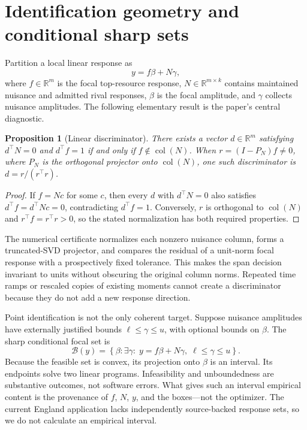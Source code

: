 \documentclass[11pt]{article}
\newtheorem{proposition}{Proposition}
\newcommand{\col}{\operatorname{col}}
\newcommand{\R}{\mathbb{R}}
\begin{document}
\section{Identification geometry and conditional sharp sets}
\label{sec:geometry}

Partition a local linear response as
\begin{equation}
  y=f\beta+N\gamma,
  \label{eq:linearresponse}
\end{equation}
where $f\in\R^m$ is the focal top-resource response, $N\in\R^{m\times k}$ contains
maintained nuisance and admitted rival responses, $\beta$ is the focal amplitude,
and $\gamma$ collects nuisance amplitudes. The following elementary result is the
paper's central diagnostic.

\begin{proposition}[Linear discriminator]
\label{prop:discriminator}
There exists a vector $d\in\R^m$ satisfying $d^{\top}N=0$ and
$d^{\top}f=1$ if and only if $f\notin\col(N)$. When $r=(I-P_N)f\neq0$, where
$P_N$ is the orthogonal projector onto $\col(N)$, one such discriminator is
$d=r/(r^{\top}r)$.
\end{proposition}

\begin{proof}
If $f=Nc$ for some $c$, then every $d$ with $d^{\top}N=0$ also satisfies
$d^{\top}f=d^{\top}Nc=0$, contradicting $d^{\top}f=1$. Conversely, $r$ is
orthogonal to $\col(N)$ and $r^{\top}f=r^{\top}r>0$, so the stated normalization
has both required properties.
\end{proof}

The numerical certificate normalizes each nonzero nuisance column, forms a
truncated-SVD projector, and compares the residual of a unit-norm focal response
with a prospectively fixed tolerance. This makes the span decision invariant to
units without obscuring the original column norms. Repeated time ramps or rescaled
copies of existing moments cannot create a discriminator because they do not add
a new response direction.

Point identification is not the only coherent target. Suppose nuisance
amplitudes have externally justified bounds $\ell\leq\gamma\leq u$, with optional
bounds on $\beta$. The sharp conditional focal set is
\begin{equation}
  \mathcal B(y)=\left\{\beta:\exists\gamma:\;
  y=f\beta+N\gamma,\;\ell\leq\gamma\leq u\right\}.
  \label{eq:identifiedset}
\end{equation}
Because the feasible set is convex, its projection onto $\beta$ is an interval.
Its endpoints solve two linear programs. Infeasibility and unboundedness are
substantive outcomes, not software errors. What gives such an interval empirical
content is the provenance of $f$, $N$, $y$, and the boxes---not the optimizer. The
current England application lacks independently source-backed response sets, so
we do not calculate an empirical interval.
\end{document}
